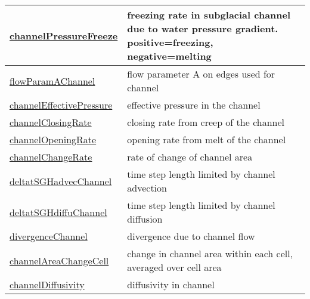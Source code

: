 {\begin{center}
\begin{longtable}{| p{2.0in} | p{4.0in} |}
    \hline
    \hyperref[subsec:var_sec_hydro_channelPressureFreeze]{channelPressureFreeze} & freezing rate in subglacial channel due to water pressure gradient.  positive=freezing, negative=melting \\
    \hline
    \hyperref[subsec:var_sec_hydro_flowParamAChannel]{flowParamAChannel} & flow parameter A on edges used for channel \\
    \hline
    \hyperref[subsec:var_sec_hydro_channelEffectivePressure]{channelEffectivePressure} & effective pressure in the channel \\
    \hline
    \hyperref[subsec:var_sec_hydro_channelClosingRate]{channelClosingRate} & closing rate from creep of the channel \\
    \hline
    \hyperref[subsec:var_sec_hydro_channelOpeningRate]{channelOpeningRate} & opening rate from melt of the channel \\
    \hline
    \hyperref[subsec:var_sec_hydro_channelChangeRate]{channelChangeRate} & rate of change of channel area \\
    \hline
    \hyperref[subsec:var_sec_hydro_deltatSGHadvecChannel]{deltatSGHadvecChannel} & time step length limited by channel advection \\
    \hline
    \hyperref[subsec:var_sec_hydro_deltatSGHdiffuChannel]{deltatSGHdiffuChannel} & time step length limited by channel diffusion \\
    \hline
    \hyperref[subsec:var_sec_hydro_divergenceChannel]{divergenceChannel} & divergence due to channel flow \\
    \hline
    \hyperref[subsec:var_sec_hydro_channelAreaChangeCell]{channelAreaChangeCell} & change in channel area within each cell, averaged over cell area \\
    \hline
    \hyperref[subsec:var_sec_hydro_channelDiffusivity]{channelDiffusivity} & diffusivity in channel \\
    \hline
\end{longtable}
\end{center}
}
